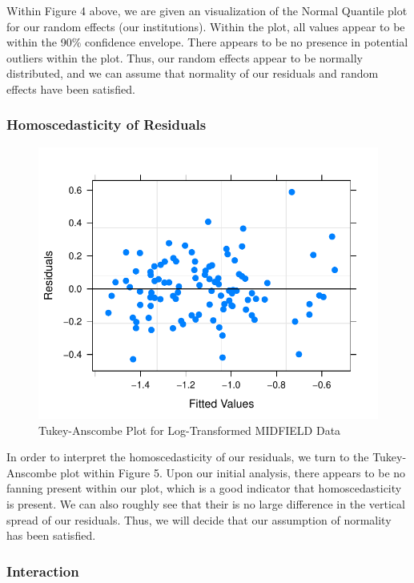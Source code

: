 \documentclass[]{article}
\begin{document}
Within Figure 4 above, we are given an visualization of the Normal
Quantile plot for our random effects (our institutions). Within the
plot, all values appear to be within the 90\% confidence envelope. There
appears to be no presence in potential outliers within the plot. Thus,
our random effects appear to be normally distributed, and we can assume
that normality of our residuals and random effects have been satisfied.

\subsubsection{Homoscedasticity of
Residuals}\label{homoscedasticity-of-residuals}

\begin{figure}
\centering
\includegraphics{Stat_461_Final_Project_Report_files/figure-latex/logHomoscedasticity-1.pdf}
\caption{Tukey-Anscombe Plot for Log-Transformed MIDFIELD Data}
\end{figure}

In order to interpret the homoscedasticity of our residuals, we turn to
the Tukey-Anscombe plot within Figure 5. Upon our initial analysis,
there appears to be no fanning present within our plot, which is a good
indicator that homoscedasticity is present. We can also roughly see that
their is no large difference in the vertical spread of our residuals.
Thus, we will decide that our assumption of normality has been
satisfied.

\subsubsection{Interaction}\label{interaction}
\end{document}
